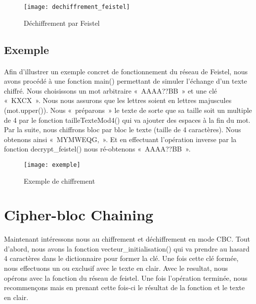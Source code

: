 \documentclass[11pt,fleqn]{book} %
\begin{document}
\begin{figure}[h]
\centering\texttt{[image: dechiffrement\_feistel]}
\caption{Déchiffrement par Feistel}
\end{figure}


\subsection{Exemple}

\paragraph{}Afin d'illustrer un exemple concret de fonctionnement du réseau de Feistel, nous avons procédé à une fonction main() permettant de simuler l'échange d'un texte chiffré.
\vspace{0.5cm}Nous choisissons un mot arbitraire « AAAA??BB » et une clé « KXCX ». Nous nous assurons que les lettres soient en lettres majuscules (mot.upper()). Nous « préparons » le texte de sorte que sa taille soit un multiple de 4 par le fonction tailleTexteMod4() qui va ajouter des espaces à la fin du mot. Par la suite, nous chiffrons bloc par bloc le texte (taille de 4 caractères). Nous obtenons ainsi « MYMWEQG, ». Et en effectuant l'opération inverse par la fonction decrypt\_feistel() nous ré-obtenons « AAAA??BB ».

\begin{figure}[h]
\centering\texttt{[image: exemple]}
\caption{Exemple de chiffrement}
\end{figure}


\section{Cipher-bloc Chaining}

\paragraph{}Maintenant intéressons nous au chiffrement et déchiffrement en mode CBC. Tout d'abord, nous avons la fonction vecteur\_initialisation() qui va prendre au hasard 4 caractères dans le dictionnaire pour former la clé. Une fois cette clé formée, nous effectuons un ou exclusif avec le texte en clair. Avec le resultat, nous opérons avec la fonction du réseau de feistel. Une fois l'opération terminée, nous recommençons mais en prenant cette fois-ci le résultat de la fonction et le texte en clair.
\end{document}

